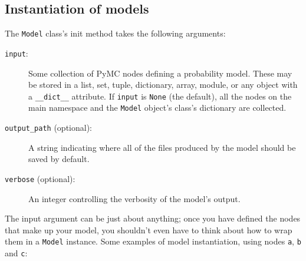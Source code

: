 \subsection{Instantiation of models} \label{sec:ModelInstantiation}
The \texttt{Model} class's init method takes the following arguments:
\begin{description}
    \item[\texttt{input}:] Some collection of PyMC nodes defining a probability model. These may be stored in a list, set, tuple, dictionary, array, module, or any object with a \texttt{__dict__} attribute. If \texttt{input} is \texttt{None} (the default), all the nodes on the main namespace and the \texttt{Model} object's class's dictionary are collected.
    \item[\texttt{output_path} (optional):] A string indicating where all of the files produced by the model should be saved by default.
    \item[\texttt{verbose} (optional):] An integer controlling the verbosity of the model's output.
\end{description}
The input argument can be just about anything; once you have defined the nodes that make up your model, you shouldn't even have to think about how to wrap them in a \texttt{Model} instance. Some examples of model instantiation, using nodes \texttt{a}, \texttt{b} and \texttt{c}:
